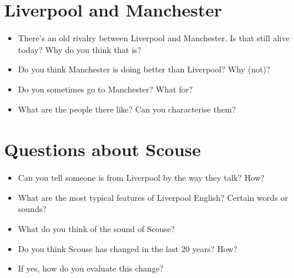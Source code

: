 	\section*{Liverpool and Manchester}
	\begin{multicols}{2}
		\begin{itemize}
			\item There's an old rivalry between Liverpool and Manchester. Is that still alive today? Why do you think that is?
			\item Do you think Manchester is doing better than Liverpool? Why (not)?
			\item Do you sometimes go to Manchester? What for?
			\item What are the people there like? Can you characterise them?
		\end{itemize}
	\end{multicols}
	
	\section*{Questions about Scouse}
	\begin{multicols}{2}
		\begin{itemize}
			\item Can you tell someone is from Liverpool by the way they talk? How?
			\item What are the most typical features of Liverpool English? Certain words or sounds?
			\item What do you think of the sound of Scouse?
			\item Do you think Scouse has changed in the last 20 years? How? 
			\item If yes, how do you evaluate this change?
		\end{itemize}		
	\end{multicols}